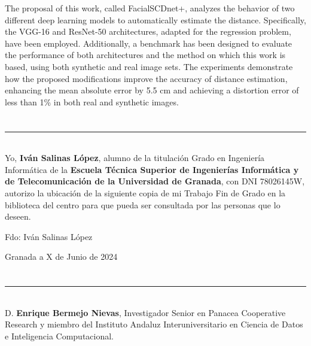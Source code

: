 The proposal of this work, called FacialSCDnet+, analyzes the behavior of two different deep learning models to automatically estimate the distance. Specifically, the VGG-16 and ResNet-50 architectures, adapted for the regression problem, have been employed. Additionally, a benchmark has been designed to evaluate the performance of both architectures and the method on which this work is based, using both synthetic and real image sets. The experiments demonstrate how the proposed modifications improve the accuracy of distance estimation, enhancing the mean absolute error by 5.5 cm and achieving a distortion error of less than 1\% in both real and synthetic images.

\chapter*{}
\thispagestyle{empty}

\noindent\rule[-1ex]{\textwidth}{2pt}\\[4.5ex]

Yo, \textbf{Iván Salinas López}, alumno de la titulación Grado en Ingeniería Informática de la \textbf{Escuela Técnica Superior de Ingenierías Informática y de Telecomunicación de la Universidad de Granada}, con DNI 78026145W, autorizo la ubicación de la siguiente copia de mi Trabajo Fin de Grado en la biblioteca del centro para que pueda ser consultada por las personas que lo deseen.

\vspace{6cm}

\noindent Fdo: Iván Salinas López

\vspace{2cm}

\begin{flushright}
Granada a X de Junio de 2024
\end{flushright}


\chapter*{}
\thispagestyle{empty}

\noindent\rule[-1ex]{\textwidth}{2pt}\\[4.5ex]

D. \textbf{Enrique Bermejo Nievas}, Investigador Senior en Panacea Cooperative Research y miembro del Instituto Andaluz Interuniversitario en Ciencia de Datos e Inteligencia Computacional.

\vspace{0.5cm}

